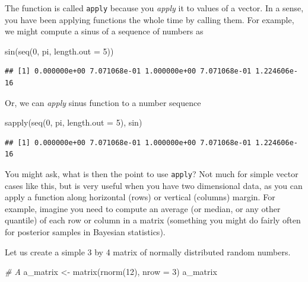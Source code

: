\documentclass[
]{book}
\newenvironment{Shaded}{\begin{snugshade}}{\end{snugshade}}
\newcommand{\AttributeTok}[1]{\textcolor[rgb]{0.77,0.63,0.00}{#1}}
\newcommand{\CommentTok}[1]{\textcolor[rgb]{0.56,0.35,0.01}{\textit{#1}}}
\newcommand{\DecValTok}[1]{\textcolor[rgb]{0.00,0.00,0.81}{#1}}
\newcommand{\FunctionTok}[1]{\textcolor[rgb]{0.00,0.00,0.00}{#1}}
\newcommand{\NormalTok}[1]{#1}
\newcommand{\OtherTok}[1]{\textcolor[rgb]{0.56,0.35,0.01}{#1}}
\begin{document}
The function is called \texttt{apply} because you \emph{apply} it to values of a vector. In a sense, you have been applying functions the whole time by calling them. For example, we might compute a sinus of a sequence of numbers as

\begin{Shaded}
\begin{Highlighting}[]
\FunctionTok{sin}\NormalTok{(}\FunctionTok{seq}\NormalTok{(}\DecValTok{0}\NormalTok{, pi, }\AttributeTok{length.out =} \DecValTok{5}\NormalTok{))}
\end{Highlighting}
\end{Shaded}

\begin{verbatim}
## [1] 0.000000e+00 7.071068e-01 1.000000e+00 7.071068e-01 1.224606e-16
\end{verbatim}

Or, we can \emph{apply} sinus function to a number sequence

\begin{Shaded}
\begin{Highlighting}[]
\FunctionTok{sapply}\NormalTok{(}\FunctionTok{seq}\NormalTok{(}\DecValTok{0}\NormalTok{, pi, }\AttributeTok{length.out =} \DecValTok{5}\NormalTok{), sin)}
\end{Highlighting}
\end{Shaded}

\begin{verbatim}
## [1] 0.000000e+00 7.071068e-01 1.000000e+00 7.071068e-01 1.224606e-16
\end{verbatim}

You might ask, what is then the point to use \texttt{apply}? Not much for simple vector cases like this, but is very useful when you have two dimensional data, as you can apply a function along horizontal (rows) or vertical (columns) margin. For example, imagine you need to compute an average (or median, or any other quantile) of each row or column in a matrix (something you might do fairly often for posterior samples in Bayesian statistics).

Let us create a simple 3 by 4 matrix of normally distributed random numbers.

\begin{Shaded}
\begin{Highlighting}[]
\CommentTok{\# A }
\NormalTok{a\_matrix }\OtherTok{\textless{}{-}} \FunctionTok{matrix}\NormalTok{(}\FunctionTok{rnorm}\NormalTok{(}\DecValTok{12}\NormalTok{), }\AttributeTok{nrow =} \DecValTok{3}\NormalTok{)}
\NormalTok{a\_matrix}
\end{Highlighting}
\end{Shaded}
\end{document}
